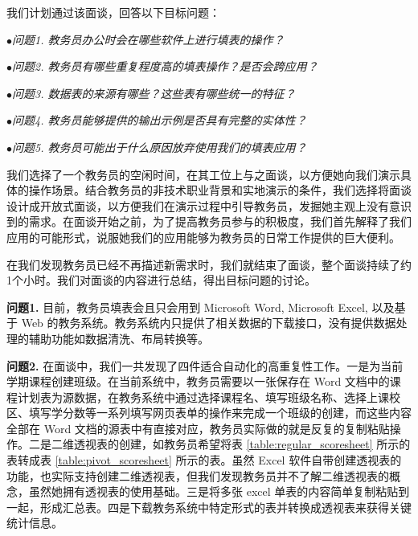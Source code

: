 \documentclass[design, pageheader]{njubachelor}
\begin{document}
我们计划通过该面谈，回答以下目标问题：

$\bullet${\itshape 问题1. 教务员办公时会在哪些软件上进行填表的操作？}

$\bullet${\itshape 问题2. 教务员有哪些重复程度高的填表操作？是否会跨应用？}

$\bullet${\itshape 问题3. 数据表的来源有哪些？这些表有哪些统一的特征？}

$\bullet${\itshape 问题4. 教务员能够提供的输出示例是否具有完整的实体性？}

$\bullet${\itshape 问题5. 教务员可能出于什么原因放弃使用我们的填表应用？}

我们选择了一个教务员的空闲时间，在其工位上与之面谈，以方便她向我们演示具体的操作场景。结合教务员的非技术职业背景和实地演示的条件，我们选择将面谈设计成开放式面谈，以方便我们在演示过程中引导教务员，发掘她主观上没有意识到的需求。在面谈开始之前，为了提高教务员参与的积极度，我们首先解释了我们应用的可能形式，说服她我们的应用能够为教务员的日常工作提供的巨大便利。

在我们发现教务员已经不再描述新需求时，我们就结束了面谈，整个面谈持续了约1个小时。我们对面谈的内容进行总结，得出目标问题的讨论。

{\bfseries 问题1.} 目前，教务员填表会且只会用到 Microsoft Word, Microsoft Excel, 以及基于 Web 的教务系统。教务系统内只提供了相关数据的下载接口，没有提供数据处理的辅助功能如数据清洗、布局转换等。

{\bfseries 问题2.} 在面谈中，我们一共发现了四件适合自动化的高重复性工作。一是为当前学期课程创建班级。在当前系统中，教务员需要以一张保存在 Word 文档中的课程计划表为源数据，在教务系统中通过选择课程名、填写班级名称、选择上课校区、填写学分数等一系列填写网页表单的操作来完成一个班级的创建，而这些内容全部在 Word 文档的源表中有直接对应，教务员实际做的就是反复的复制粘贴操作。二是二维透视表的创建，如教务员希望将表 \ref{table:regular_scoresheet} 所示的表转成表 \ref{table:pivot_scoresheet} 所示的表。虽然 Excel 软件自带创建透视表的功能，也实际支持创建二维透视表，但我们发现教务员并不了解二维透视表的概念，虽然她拥有透视表的使用基础。三是将多张 excel 单表的内容简单复制粘贴到一起，形成汇总表。四是下载教务系统中特定形式的表并转换成透视表来获得关键统计信息。
\end{document}
